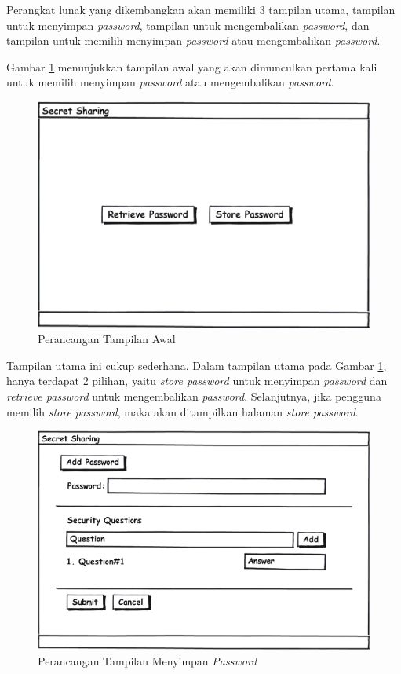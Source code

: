 Perangkat lunak yang dikembangkan akan memiliki 3 tampilan utama, tampilan untuk menyimpan \textit{password}, tampilan untuk mengembalikan \textit{password}, dan tampilan untuk memilih menyimpan \textit{password} atau mengembalikan \textit{password}.

Gambar \ref{fig:tampilan-awal} menunjukkan tampilan awal yang akan dimunculkan pertama kali untuk memilih menyimpan \textit{password} atau mengembalikan \textit{password}.

\begin{figure}[h]
	\centerline{\includegraphics[scale=0.5]{Gambar/tampilan-utama}}
	\caption{Perancangan Tampilan Awal}\label{fig:tampilan-awal}
\end{figure}

Tampilan utama ini cukup sederhana. Dalam tampilan utama pada Gambar \ref{fig:tampilan-awal}, hanya terdapat 2 pilihan, yaitu \textit{store password} untuk menyimpan \textit{password} dan \textit{retrieve password} untuk mengembalikan \textit{password}. Selanjutnya, jika pengguna memilih \textit{store password}, maka akan ditampilkan halaman \textit{store password}.

\begin{figure}[h]
	\centerline{\includegraphics[scale=0.5]{Gambar/store_password}}
	\caption{Perancangan Tampilan Menyimpan \textit{Password}}\label{fig:store_password}
\end{figure}

